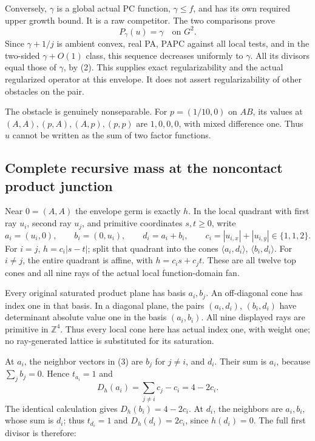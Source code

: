 \documentclass[
  10pt,
]{article}
\begin{document}
Conversely, \(\gamma\) is a global actual PC function, \(\gamma\leq f\),
and has its own required upper growth bound. It is a raw competitor. The
two comparisons prove \[
                              P_\gamma(u)=\gamma\quad\text{on }G^2.
 \tag{10}
\] Since \(\gamma+1/j\) is ambient convex, real PA, PAPC against all
local tests, and in the two-sided \(\gamma+O(1)\) class, this sequence
decreases uniformly to \(\gamma\). All its divisors equal those of
\(\gamma\), by (2). This supplies exact regularizability and the actual
regularized operator at this envelope. It does not assert
regularizability of other obstacles on the pair.

The obstacle is genuinely nonseparable. For \(p=(1/10,0)\) on \(AB\),
its values at \((A,A),(p,A),(A,p),(p,p)\) are \(1,0,0,0\), with mixed
difference one. Thus \(u\) cannot be written as the sum of two factor
functions.

\subsection{Complete recursive mass at the noncontact product
junction}\label{complete-recursive-mass-at-the-noncontact-product-junction}

Near \(0=(A,A)\) the envelope germ is exactly \(h\). In the local
quadrant with first ray \(u_i\), second ray \(u_j\), and primitive
coordinates \(s,t\geq0\), write \[
 a_i=(u_i,0),\qquad b_i=(0,u_i),\qquad d_i=a_i+b_i,
 \qquad c_i=|u_{i,x}|+|u_{i,y}|\in\{1,1,2\}.
\] For \(i=j\), \(h=c_i|s-t|\); split that quadrant into the cones
\(\langle a_i,d_i\rangle\), \(\langle b_i,d_i\rangle\). For \(i\ne j\),
the entire quadrant is affine, with \(h=c_is+c_jt\). These are all
twelve top cones and all nine rays of the actual local function-domain
fan.

Every original saturated product plane has basis \(a_i,b_j\). An
off-diagonal cone has index one in that basis. In a diagonal plane, the
pairs \((a_i,d_i)\), \((b_i,d_i)\) have determinant absolute value one
in the basis \((a_i,b_i)\). All nine displayed rays are primitive in
\(\mathbb Z^4\). Thus every local cone here has actual index one, with
weight one; no ray-generated lattice is substituted for its saturation.

At \(a_i\), the neighbor vectors in (3) are \(b_j\) for \(j\ne i\), and
\(d_i\). Their sum is \(a_i\), because \(\sum_jb_j=0\). Hence
\(t_{a_i}=1\) and \[
 D_h(a_i)=\sum_{j\ne i}c_j-c_i=4-2c_i.
\] The identical calculation gives \(D_h(b_i)=4-2c_i\). At \(d_i\), the
neighbors are \(a_i,b_i\), whose sum is \(d_i\); thus \(t_{d_i}=1\) and
\(D_h(d_i)=2c_i\), since \(h(d_i)=0\). The full first divisor is
therefore:
\end{document}
